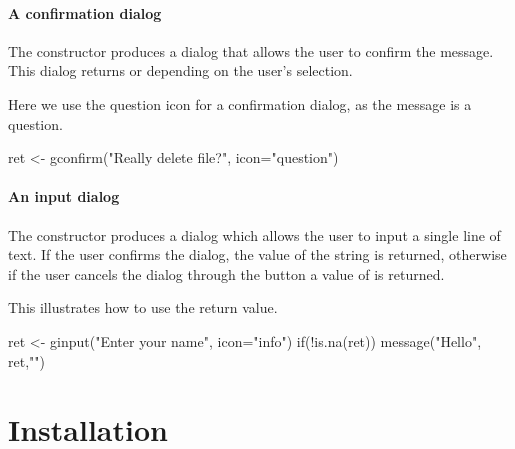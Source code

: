 \paragraph{A confirmation dialog}
The constructor  produces a dialog that allows
the user to confirm the message. This dialog returns  or
 depending on the user's selection.


Here we use the question icon for a confirmation dialog, as the message is a question.
\begin{Schunk}
\begin{Sinput}
 ret <- gconfirm("Really delete file?", icon="question")
\end{Sinput}
\end{Schunk}


\paragraph{An input dialog}
The  constructor produces a dialog which allows
the user to input a single line of text. If the user confirms the
dialog, the value of the string is returned, otherwise if the user
cancels the dialog through the button a value of  is returned.


This illustrates how to use the return value.
\begin{Schunk}
\begin{Sinput}
 ret <- ginput("Enter your name", icon="info")
 if(!is.na(ret)) 
   message("Hello", ret,"\n")
\end{Sinput}
\end{Schunk}







\section{Installation}
\label{sec:installation}



